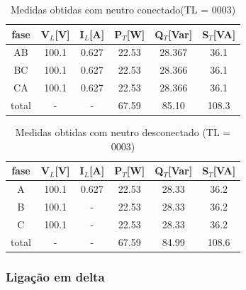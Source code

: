 \documentclass[a4paper, 12pt]{article}
\begin{document}
    \begin{table}[H]
         \centering
        \begin{tabular}{|c|c|c|c|c|c|}
              \hline %
                  fase & V\(_L\)[V] & I\(_L\)[A] & P\(_T\)[W] & Q\(_T\)[Var] & S\(_T\)[VA] \\
              \hline %
           AB & 100.1 & 0.627 & 22.53 & 28.367 & 36.1     \\ 
              \hline %
           BC & 100.1 & 0.627 & 22.53 & 28.366 & 36.1     \\ 
              \hline %
           CA & 100.1 & 0.627 & 22.53 & 28.366 & 36.1     \\ 
              \hline %
           total & - & - & 67.59 & 85.10 & 108.3     \\ 
              \hline %
        \end{tabular}
        \caption{Medidas obtidas com neutro conectado(TL = 0003)}
    \end{table}

    \begin{table}[H]
         \centering
        \begin{tabular}{|c|c|c|c|c|c|}
              \hline %
                  fase & V\(_L\)[V] & I\(_L\)[A] & P\(_T\)[W] & Q\(_T\)[Var] & S\(_T\)[VA] \\
              \hline %
           A & 100.1 & 0.627 & 22.53 & 28.33 & 36.2     \\ 
              \hline %
           B & 100.1 & - & 22.53 & 28.33 & 36.2     \\ 
              \hline %
           C & 100.1 & - & 22.53 & 28.33 & 36.2     \\ 
              \hline %
           total & - & - & 67.59 & 84.99 & 108.6     \\ 
              \hline %
        \end{tabular}
        \caption{Medidas obtidas com neutro desconectado (TL = 0003) }
    \end{table}





        \subsubsection{Ligação em delta}
        \justifying
\end{document}
